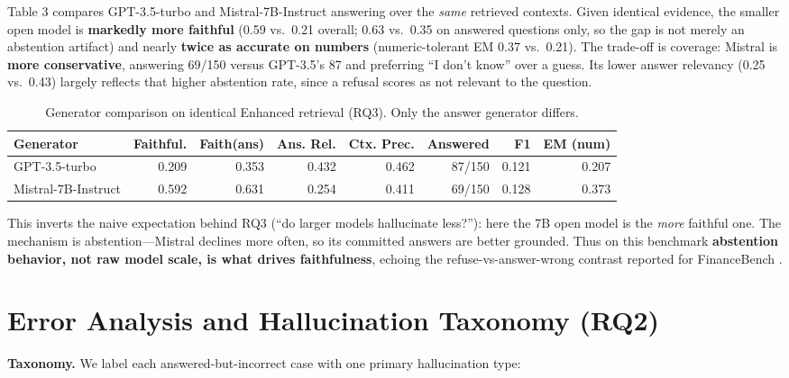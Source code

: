 \documentclass[11pt]{article}
\begin{document}
Table 3 compares GPT-3.5-turbo and Mistral-7B-Instruct answering over
the \emph{same} retrieved contexts. Given identical evidence, the
smaller open model is \textbf{markedly more faithful} (0.59 vs.~0.21
overall; 0.63 vs.~0.35 on answered questions only, so the gap is not
merely an abstention artifact) and nearly \textbf{twice as accurate on
numbers} (numeric-tolerant EM 0.37 vs.~0.21). The trade-off is coverage:
Mistral is \textbf{more conservative}, answering 69/150 versus GPT-3.5's
87 and preferring ``I don't know'' over a guess. Its lower answer
relevancy (0.25 vs.~0.43) largely reflects that higher abstention rate,
since a refusal scores as not relevant to the question.

\begin{table}[t]\centering\small
\begin{tabular}{lrrrrrrr}
\toprule
Generator & Faithful. & Faith(ans) & Ans. Rel. & Ctx. Prec. & Answered & F1 & EM (num) \\
\midrule
GPT-3.5-turbo & 0.209 & 0.353 & 0.432 & 0.462 & 87/150 & 0.121 & 0.207 \\
Mistral-7B-Instruct & 0.592 & 0.631 & 0.254 & 0.411 & 69/150 & 0.128 & 0.373 \\
\bottomrule
\end{tabular}
\caption{Generator comparison on identical Enhanced retrieval (RQ3). Only the answer generator differs.}
\label{tab:gen}
\end{table}

This inverts the naive expectation behind RQ3 (``do larger models
hallucinate less?''): here the 7B open model is the \emph{more} faithful
one. The mechanism is abstention---Mistral declines more often, so its
committed answers are better grounded. Thus on this benchmark
\textbf{abstention behavior, not raw model scale, is what drives
faithfulness}, echoing the refuse-vs-answer-wrong contrast reported for
FinanceBench \citep{islam2023financebench}.

\hypertarget{error-analysis-and-hallucination-taxonomy-rq2}{%
\section{Error Analysis and Hallucination Taxonomy
(RQ2)}\label{error-analysis-and-hallucination-taxonomy-rq2}}

\textbf{Taxonomy.} We label each answered-but-incorrect case with one
primary hallucination type:
\end{document}

